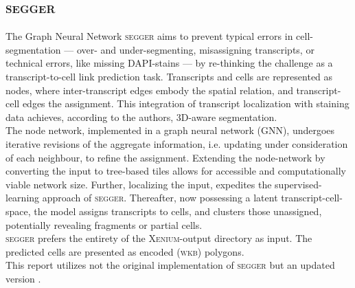 \subsection*{\color{segger}\textsc{segger}}
The Graph Neural Network \textsc{segger} aims to prevent typical errors in cell-segmentation --- over- and under-segmenting, misassigning transcripts, or technical errors, like missing DAPI-stains --- by re-thinking the challenge as a transcript-to-cell link prediction task. Transcripts and cells are represented as nodes, where inter-transcript edges embody the spatial relation, and transcript-cell edges the assignment. This integration of transcript localization with staining data achieves, according to the authors, 3D-aware segmentation. \cite{heidari_segger_2025}\\
The node network, implemented in a graph neural network (GNN), undergoes iterative revisions of the aggregate information, i.e. updating under consideration of each neighbour, to refine the assignment. Extending the node-network by converting the input to tree-based tiles allows for accessible and computationally viable network size. Further, localizing the input, expedites the supervised-learning approach of \textsc{segger}. Thereafter, now possessing a latent transcript-cell-space, the model assigns transcripts to cells, and clusters those unassigned, potentially revealing fragments or partial cells.\\
\textsc{segger} prefers the entirety of the \textsc{Xenium}-output directory as input. The predicted cells are presented as encoded (\textsc{wkb}) polygons.\\
This report utilizes not the original implementation of \textsc{segger} \cite{heidari_elihei2segger_dev_2026} but an updated version \cite{noauthor_dpeerlabsegger_2026}.
